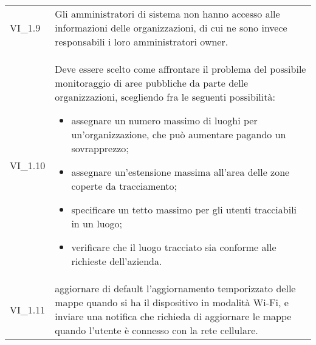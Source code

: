{\begin{longtable}{ >{\centering}p{} >{}p{}}
	VI\_1.9 & Gli amministratori di sistema non hanno accesso alle informazioni delle organizzazioni\ap{G}, di cui ne sono invece responsabili i loro amministratori owner. \\
	VI\_1.10 & Deve essere scelto come affrontare il problema del possibile monitoraggio di aree pubbliche da parte delle organizzazioni\ap{G}, scegliendo fra le seguenti possibilità:
	\begin{itemize}
		\item assegnare un numero massimo di luoghi per un'organizzazione\ap{G}, che può aumentare pagando un sovrapprezzo;
		\item assegnare un'estensione massima all'area delle zone coperte da tracciamento;
		\item specificare un tetto massimo per gli utenti tracciabili in un luogo;
		\item verificare che il luogo tracciato sia conforme alle richieste dell'azienda.
	\end{itemize} \mbox{} \\
	VI\_1.11 & aggiornare di default l’aggiornamento temporizzato delle mappe quando si ha il dispositivo in modalità Wi-Fi, e inviare una notifica che richieda di aggiornare le mappe quando l’utente è connesso con la rete cellulare. \\
\end{longtable}
}

